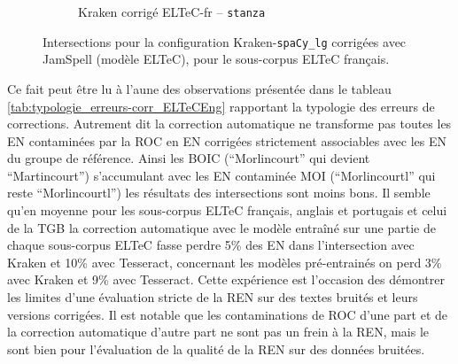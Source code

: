 \begin{figure}[h!]
\begin{minipage}{7cm}
\begin{subfigure}{1\textwidth}
  \caption{Kraken corrigé ELTeC-fr -- \texttt{stanza}}
  \label{fig:ELTeCFRA_Kraken -- jspl-ELTeCFR_stanza-concat_intersection}
  \end{subfigure}
    \end{minipage}
\caption{Intersections pour la configuration Kraken-\texttt{spaCy\_lg} corrigées avec JamSpell (modèle ELTeC), pour le sous-corpus ELTeC français.}
\label{fig:intersection_globale-kraken}
\end{figure}

Ce fait peut être lu à l'aune %
des observations présentée dans le tableau \ref{tab:typologie_erreurs-corr_ELTeCEng} rapportant la typologie des erreurs de corrections. Autrement dit la correction automatique ne transforme pas toutes les EN contaminées par la ROC en EN corrigées strictement associables avec les EN du groupe de référence. Ainsi les BOIC (``Morlincourt'' qui devient ``Martincourt'') s'accumulant avec les EN contaminée MOI (``Morlincourtl'' qui reste ``Morlincourtl'') les résultats des intersections sont moins bons. Il semble qu'en moyenne pour les sous-corpus ELTeC français, anglais et portugais et celui de la TGB la correction automatique avec le modèle entraîné sur une partie de chaque sous-corpus ELTeC fasse perdre 5\% des EN dans l'intersection avec Kraken et 10\% avec Tesseract, concernant les modèles pré-entrainés on perd 3\% avec Kraken et 9\% avec Tesseract. Cette expérience est l'occasion des démontrer les limites d'une évaluation stricte de la REN sur des textes bruités et leurs versions corrigées. Il est notable que les contaminations de ROC d'une part et de la correction automatique d'autre part ne sont pas un frein à la REN, mais le sont bien pour l'évaluation de la qualité de la REN sur des données bruitées.

